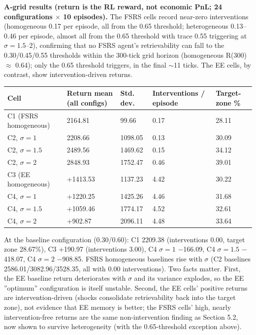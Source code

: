 \documentclass[11pt]{article}
\begin{document}
\textbf{A-grid results (return is the RL reward, not economic PnL; 24 configurations $\times$ 10 episodes).} The FSRS cells record near-zero interventions (homogeneous 0.17 per episode, all from the 0.65 threshold; heterogeneous 0.13--0.46 per episode, almost all from the 0.65 threshold with trace 0.55 triggering at $\sigma=1.5$--$2$), confirming that no FSRS agent's retrievability can fall to the 0.30/0.45/0.55 thresholds within the 300-tick grid horizon (homogeneous R(300) $\approx$ 0.64); only the 0.65 threshold triggers, in the final $\sim$11 ticks. The EE cells, by contrast, show intervention-driven returns.

\begin{table}[htbp]
\centering
\begin{tabular}{lllll}
\toprule
\textbf{Cell} & \textbf{Return mean (all configs)} & \textbf{Std. dev.} & \textbf{Interventions / episode} & \textbf{Target-zone \%} \\
\midrule
C1 (FSRS homogeneous) & 2164.81 & 99.66 & 0.17 & 28.11 \\
C2, $\sigma=1$ & 2208.66 & 1098.05 & 0.13 & 30.09 \\
C2, $\sigma=1.5$ & 2489.56 & 1469.62 & 0.15 & 34.12 \\
C2, $\sigma=2$ & 2848.93 & 1752.47 & 0.46 & 39.01 \\
C3 (EE homogeneous) & +1413.53 & 1137.23 & 4.42 & 30.22 \\
C4, $\sigma=1$ & +1220.25 & 1425.26 & 4.46 & 31.68 \\
C4, $\sigma=1.5$ & +1059.46 & 1774.17 & 4.52 & 32.61 \\
C4, $\sigma=2$ & +902.87 & 2096.11 & 4.48 & 33.64 \\
\bottomrule
\end{tabular}
\end{table}

At the baseline configuration (0.30/0.60): C1 2209.38 (interventions 0.00, target zone 28.67\%), C3 +190.97 (interventions 3.00), C4 $\sigma=1$ $-$166.09, C4 $\sigma=1.5$ $-$418.07, C4 $\sigma=2$ $-$908.85. FSRS homogeneous baselines rise with $\sigma$ (C2 baselines 2586.01/3082.96/3528.35, all with 0.00 interventions). Two facts matter. First, the EE baseline return deteriorates with $\sigma$ and its variance explodes, so the EE ''optimum'' configuration is itself unstable. Second, the EE cells' positive returns are intervention-driven (shocks consolidate retrievability back into the target zone), not evidence that EE memory is better; the FSRS cells' high, nearly intervention-free returns are the same non-intervention finding as Section 5.2, now shown to survive heterogeneity (with the 0.65-threshold exception above).
\end{document}
